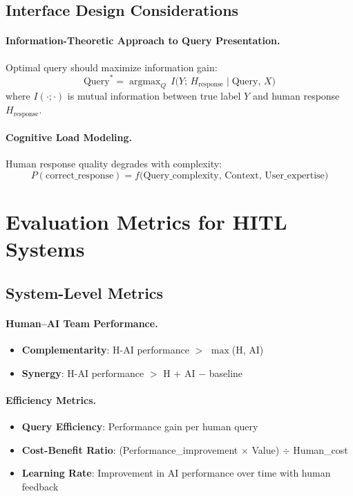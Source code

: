 \subsection{Interface Design Considerations}

\paragraph{Information-Theoretic Approach to Query Presentation.}

Optimal query should maximize information gain:
\[
\text{Query}^* = \operatorname{argmax}_{Q}\, I\bigl(Y;\, H_{\text{response}} \mid \text{Query},\, X\bigr)
\]
where $I(\cdot;\cdot)$ is mutual information between true label $Y$ and human response $H_{\text{response}}$.

\paragraph{Cognitive Load Modeling.}

Human response quality degrades with complexity:
\[
P(\text{correct\_response}) = f\!\bigl(\text{Query\_complexity},\,
  \text{Context},\, \text{User\_expertise}\bigr)
\]

\section{Evaluation Metrics for HITL Systems}

\subsection{System-Level Metrics}

\paragraph{Human--AI Team Performance.}
\begin{itemize}
    \item \textbf{Complementarity}: H-AI performance $>$ $\max$(H, AI)
    \item \textbf{Synergy}: H-AI performance $>$ H $+$ AI $-$ baseline
\end{itemize}

\paragraph{Efficiency Metrics.}
\begin{itemize}
    \item \textbf{Query Efficiency}: Performance gain per human query
    \item \textbf{Cost-Benefit Ratio}: (Performance\_improvement $\times$ Value) $\div$ Human\_cost
    \item \textbf{Learning Rate}: Improvement in AI performance over time with human feedback
\end{itemize}

